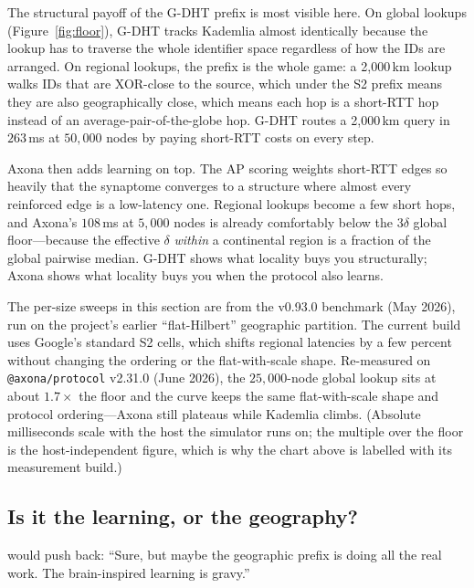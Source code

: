 \documentclass[nobib,justified]{tufte-handout}
\begin{document}
The structural payoff of the G-DHT prefix is most visible here.  On global lookups (Figure~\ref{fig:floor}), G-DHT tracks Kademlia almost identically because the lookup has to traverse the whole identifier space regardless of how the IDs are arranged.  On regional lookups, the prefix is the whole game: a 2{,}000\,km lookup walks IDs that are XOR-close to the source, which under the S2 prefix means they are also geographically close, which means each hop is a short-RTT hop instead of an average-pair-of-the-globe hop.  G-DHT routes a 2{,}000\,km query in $263$\,ms at $50{,}000$ nodes by paying short-RTT costs on every step.

Axona then adds learning on top.  The AP scoring weights short-RTT edges so heavily that the synaptome converges to a structure where almost every reinforced edge is a low-latency one.  Regional lookups become a few short hops, and Axona's $108$\,ms at $5{,}000$ nodes is already comfortably below the $3\delta$ global floor---because the effective $\delta$ \emph{within} a continental region is a fraction of the global pairwise median.  G-DHT shows what locality buys you structurally; Axona shows what locality buys you when the protocol also learns.

 The per-size sweeps in this section are from the v0.93.0 benchmark (May 2026), run on the project's earlier ``flat-Hilbert'' geographic partition. The current build uses Google's standard S2 cells, which shifts regional latencies by a few percent without changing the ordering or the flat-with-scale shape. Re-measured on \texttt{@axona/protocol} v2.31.0 (June 2026), the $25{,}000$-node global lookup sits at about $1.7\times$ the floor and the curve keeps the same flat-with-scale shape and protocol ordering---Axona still plateaus while Kademlia climbs. (Absolute milliseconds scale with the host the simulator runs on; the multiple over the floor is the host-independent figure, which is why the chart above is labelled with its measurement build.)

\subsection{Is it the learning, or the geography?}

 would push back: ``Sure, but maybe the geographic prefix is doing all the real work. The brain-inspired learning is gravy.''
\end{document}

